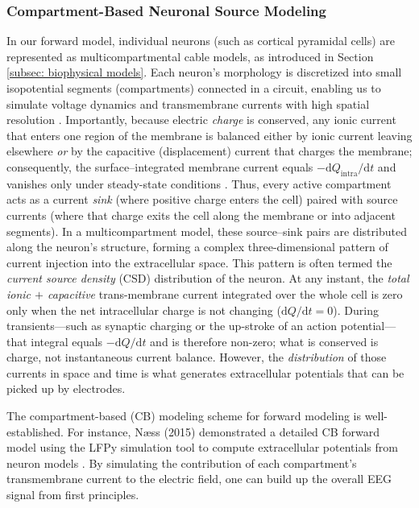 \documentclass[final, a4paper,masters,en,listoffigures,listoftables,norwegiandates]{NMBU}
\begin{document}
\subsubsection{Compartment-Based Neuronal Source Modeling}

In our forward model, individual neurons (such as cortical pyramidal cells) are represented as multicompartmental cable models, as introduced in Section \ref{subsec: biophysical models}. Each neuron’s morphology is discretized into small isopotential segments (compartments) connected in a circuit, enabling us to simulate voltage dynamics and transmembrane currents with high spatial resolution \cite{Halnes2024ElectricBrainSignals}. Importantly, because electric \emph{charge} is conserved, any ionic current that enters one region of the membrane is balanced either by ionic current leaving elsewhere \emph{or} by the capacitive (displacement) current that charges the membrane; consequently, the surface–integrated membrane current equals $-\mathrm{d}Q_{\mathrm{intra}}/\mathrm{d}t$ and vanishes only under steady-state conditions \cite{kandel2021principles}. Thus, every active compartment acts as a current \textit{sink} (where positive charge enters the cell) paired with source currents (where that charge exits the cell along the membrane or into adjacent segments). In a multicompartment model, these source–sink pairs are distributed along the neuron’s structure, forming a complex three-dimensional pattern of current injection into the extracellular space. This pattern is often termed the \textit{current source density} (CSD) distribution of the neuron. At any instant, the \emph{total ionic $+$ capacitive} trans-membrane current integrated over the whole cell is zero only when the net intracellular charge is not changing ($\mathrm{d}Q/\mathrm{d}t = 0$).  During transients—such as synaptic charging or the up-stroke of an action potential—that integral equals $-\mathrm{d}Q/\mathrm{d}t$ and is therefore non-zero; what is conserved is charge, not instantaneous current balance.
 However, the \textit{distribution} of those currents in space and time is what generates extracellular potentials that can be picked up by electrodes.

The compartment-based (CB) modeling scheme for forward modeling is well-established. For instance, Næss (2015) demonstrated a detailed CB forward model using the LFPy simulation tool to compute extracellular potentials from neuron models \cite{Næss2015}. By simulating the contribution of each compartment’s transmembrane current to the electric field, one can build up the overall EEG signal from first principles.
\end{document}
